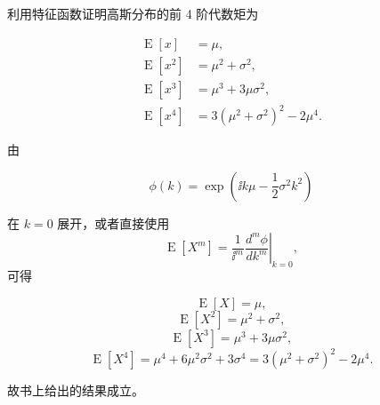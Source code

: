 \begin{question}
利用特征函数证明高斯分布的前 4 阶代数矩为

\[
\begin{split}
\operatorname{E}[x]&=\mu,\\
\operatorname{E}[x^2]&=\mu^2+\sigma^2,\\
\operatorname{E}[x^3]&=\mu^3+3\mu\sigma^2,\\
\operatorname{E}[x^4]&=3(\mu^2+\sigma^2)^2-2\mu^4.
\end{split}
\]
\begin{solution}
由

\[
\phi(k)=\exp\!\left(\ii k\mu-\frac12\sigma^2k^2\right)
\]

在 \(k=0\) 展开，或者直接使用 \[
\operatorname{E}[X^m]=\left.\frac{1}{\ii^m}\frac{d^m\phi}{dk^m}\right|_{k=0},
\] 可得

\[
\operatorname{E}[X]=\mu,
\] \[
\operatorname{E}[X^2]=\mu^2+\sigma^2,
\] \[
\operatorname{E}[X^3]=\mu^3+3\mu\sigma^2,
\] \[
\operatorname{E}[X^4]=\mu^4+6\mu^2\sigma^2+3\sigma^4
=3(\mu^2+\sigma^2)^2-2\mu^4.
\]

故书上给出的结果成立。
\end{solution}
\end{question}


